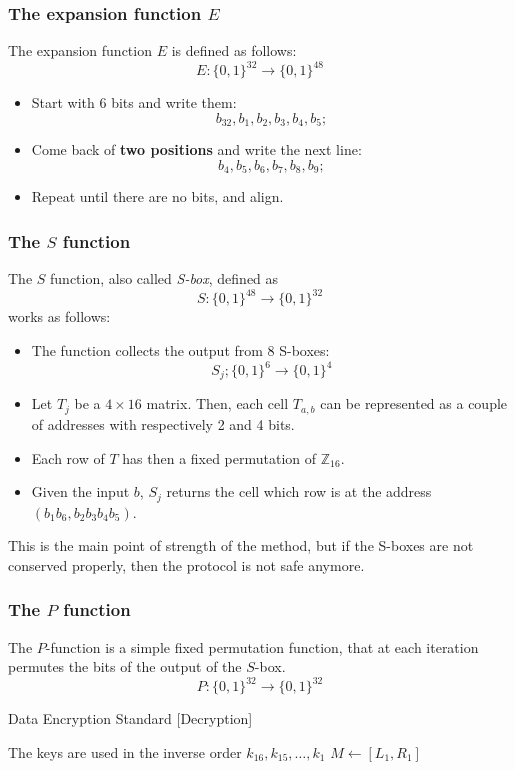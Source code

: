 \subsubsection{The expansion function $E$}
The expansion function $E$ is defined as follows:
\[E: \{0,1\}^{32} \rightarrow \{0,1\}^{48}\]
\begin{itemize}
    \item Start with 6 bits and write them:
    \[b_{32}, b_{1}, b_{2}, b_{3}, b_{4}, b_{5};\]
    \item Come back of \textbf{two positions} and write the next line:
    \[b_{4}, b_{5}, b_{6}, b_{7}, b_{8}, b_{9};\]
    \item Repeat until there are no bits, and align.
\end{itemize}

\subsubsection{The $S$ function}
The $S$ function, also called \emph{S-box}, defined as
\[S: \{0,1\}^{48} \rightarrow \{0,1\}^{32}\]
works as follows:
\begin{itemize}
    \item The function collects the output from 8 S-boxes:
    \[S_{j}; \{0,1\}^{6} \rightarrow \{0,1\}^{4}\]
    \item Let $T_{j}$ be a $4 \times 16$ matrix. Then, each cell $T_{a,b}$ can be represented as a couple of addresses with respectively 2 and 4 bits.
    \item Each row of $T$ has then a fixed permutation of $\mathbb{Z}_{16}$.
    \item Given the input $b$, $S_{j}$ returns the cell which row is at the address $(b_{1}b_{6}, b_{2}b_{3}b_{4}b_{5})$.
\end{itemize}
This is the main point of strength of the method, but if the S-boxes are not conserved properly, then the protocol is not safe anymore.

\subsubsection{The $P$ function}
The $P$-function is a simple fixed permutation function, that at each iteration permutes the bits of the output of the $S$-box.
\[P: \{0,1\}^{32} \rightarrow \{0,1\}^{32}\]

\begin{algorithm}
\caption{Data Encryption Standard [Decryption]}\label{alg:DES_decrypt}
The keys are used in the inverse order $k_{16}, k_{15}, \dots, k_{1}$\;
$M \gets [L_{1}, R_{1}]$\;
\end{algorithm}

